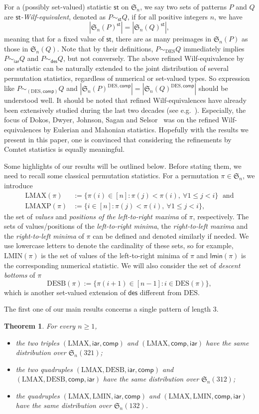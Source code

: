 \documentclass[12pt]{amsart}
\numberwithin{equation}{section}
\theoremstyle{plain}
\newtheorem{theorem}{Theorem}[section]
\theoremstyle{definition}
\def\des{\mathsf{des}}
\def\S{\mathfrak{S}}
\def\iar{\mathsf{iar}}
\def\comp{\mathsf{comp}}
\def\DES{\mathrm{DES}}
\def\LMAX{\mathrm{LMAX}}
\def\LMAXP{\mathrm{LMAXP}}
\def\LMIN{\mathrm{LMIN}}
\def\st{\mathsf{st}}
\def\DESB{\mathrm{DESB}}
\def\lmin{\mathsf{lmin}}
\def\DESB{\mathrm{DESB}}
\begin{document}
For a (possibly set-valued) statistic $\st$ on $\S_n$, we say two sets of patterns $P$ and $Q$ are {\em $\st$-Wilf-equivalent}, denoted as $P\sim_{\st}Q$, if for all positive integers $n$, we have
$$|\S_n(P)^{\st}|=|\S_n(Q)^{\st}|,$$
meaning that for a fixed value of $\st$, there are as many preimages in $\S_n(P)$ as those in $\S_n(Q)$. Note that by their definitions, $P\sim_{\DES}Q$ immediately implies $P\sim_{\iar}Q$ and $P\sim_{\des}Q$, but not conversely. The above refined Wilf-equivalence by one statistic can be naturally extended to the joint distribution of several permutation statistics, regardless of numerical or set-valued types. So expression like $P\sim_{(\DES,\comp)}Q$ and $|\S_n(P)^{\DES,\comp}|=|\S_n(Q)^{\DES,\comp}|$ should be understood well. It should be noted that refined Wilf-equivalences have already been extensively studied during the last two decades (see e.g.~\cite{CK,DDJSS,EP,kit,LK}). Especially, the focus of Dokos, Dwyer, Johnson, Sagan and Selsor~\cite{DDJSS} was on the refined Wilf-equivalences by Eulerian and Mahonian statistics. Hopefully with the results we present in this paper, one is convinced that considering the refinements by Comtet statistics is equally meaningful. 


Some highlights of our results will be outlined below. Before stating them, we need to recall some classical permutation statistics. For a permutation  $\pi\in\S_n$, we introduce 
\begin{align*}
\LMAX(\pi) &:=\{\pi(i)\in[n]:\pi(j)<\pi(i),\: \forall 1\le j < i\} \,\,\; \text{and}\\
\LMAXP(\pi) &:=\{i\in[n]:\pi(j)<\pi(i),\: \forall 1\le j < i\},
\end{align*}
the set of {\em values} and {\em positions of the left-to-right maxima} of $\pi$, respectively. The sets of values/positions of the {\em left-to-right minima}, the {\em right-to-left maxima} and the {\em right-to-left minima} of $\pi$ can be defined and denoted similarly if needed. 
We use lowercase letters to denote the cardinality of these sets, so for example,  $\LMIN(\pi)$ is the set of values of the left-to-right minima of $\pi$ and $\lmin(\pi)$ is the corresponding numerical statistic. We will also consider the set of {\em descent bottoms} of $\pi$
$$\DESB(\pi):=\{\pi(i+1)\in[n-1]: i\in\DES(\pi)\},$$
 which is another set-valued extension of $\des$ different from $\DES$. 
 
 The first one of our main results concerns a single pattern of length $3$.

\begin{theorem}\label{main:thm1}
For every $n\ge 1$, 
\begin{itemize}
\item[(i)] the two triples $(\LMAX,\iar,\comp)$ and $(\LMAX,\comp,\iar)$ have the same distribution over $\S_n(321)$; 
\item[(ii)] the two quadruples $(\LMAX,\DESB,\iar,\comp)$ and $(\LMAX,\DESB,\comp,\iar)$ have the same distribution over $\S_n(312)$;
\item[(iii)] the quadruples $(\LMAX, \LMIN, \iar, \comp)$ and $(\LMAX, \LMIN, \comp, \iar)$ have the same distribution over $\S_n(132)$.
\end{itemize}
\end{theorem}
\end{document}
